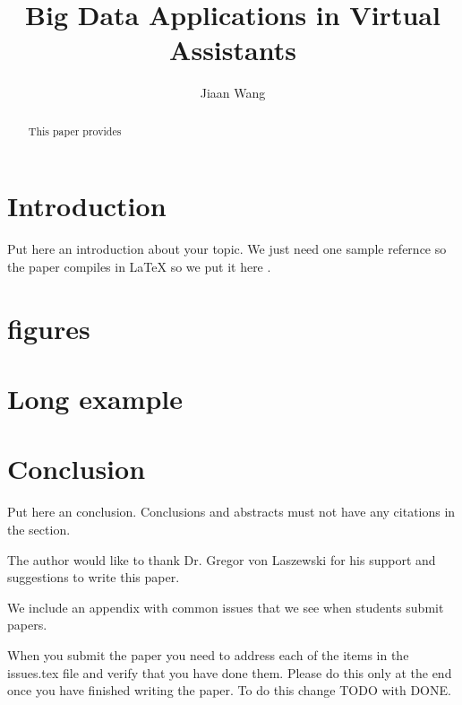 \documentclass[sigconf]{acmart}
\begin{document}
\title{Big Data Applications in Virtual Assistants}

\author{Jiaan Wang}

\begin{abstract}

    This paper provides
    
\end{abstract}


\maketitle

\section{Introduction}

Put here an introduction about your topic. 
We just need one sample refernce so the paper compiles in LaTeX so we
put it here \cite{Tal2015internet} \cite{Waters2015life} \cite{Elgan2016future} \cite{Hard2014applications} \cite{Mueller2016analytics} \cite{Team2012data} \cite{Marvin2017them} \cite{Kinsbruner2017wants} \cite{Srivastava2016upswing} \cite{Boulton2016assistants} \cite{Simonite2016you} \cite{Etherington2014now} \cite{Baron2017assistants}.

\section{figures}

\section{Long example}

\section{Conclusion}

Put here an conclusion. Conclusions and abstracts must not have any
citations in the section.

\begin{acks}

  The author would like to thank Dr. Gregor von Laszewski for his
  support and suggestions to write this paper.

\end{acks}


 

\appendix

We include an appendix with common issues that we see when students
submit papers.

When you submit the paper you need to address each of the items in the
issues.tex file and verify that you have done them. Please do this
only at the end once you have finished writing the paper. To do this
change TODO with DONE. 

% 
\end{document}
